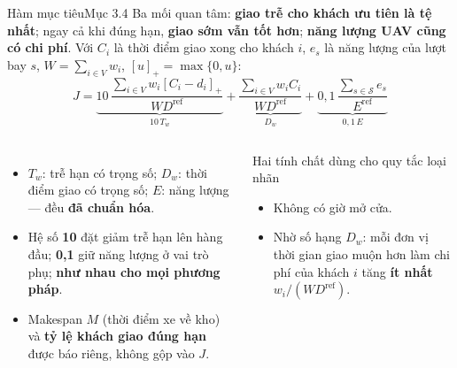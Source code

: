 \documentclass[aspectratio=169,10pt,t,xcolor={table}]{beamer}
\newcommand{\pos}[1]{\left[#1\right]_{+}}
\newcommand{\Dref}{D^{\mathrm{ref}}}
\newcommand{\Eref}{E^{\mathrm{ref}}}
\newcommand{\src}[1]{\hfill{\normalfont\footnotesize\color{white!62!navy}#1}}  %
\begin{document}
\begin{frame}{Hàm mục tiêu\src{Mục 3.4}}
\footnotesize
Ba mối quan tâm: \textbf{giao trễ cho khách ưu tiên là tệ nhất}; ngay cả khi đúng hạn, \textbf{giao sớm vẫn tốt hơn}; \textbf{năng lượng UAV cũng có chi phí}.
Với $C_i$ là thời điểm giao xong cho khách $i$, $e_s$ là năng lượng của lượt bay $s$, $W=\sum_{i\in V}w_i$, $\pos{u}=\max\{0,u\}$:
\begin{equation}\tag{2}
J=\underbrace{10\,\frac{\sum_{i\in V}w_i\pos{C_i-d_i}}{W\Dref}}_{10\,T_w}
 +\underbrace{\frac{\sum_{i\in V}w_iC_i}{W\Dref}}_{D_w}
 +\underbrace{0{,}1\,\frac{\sum_{s\in\mathcal S}e_s}{\Eref}}_{0{,}1\,E}
\end{equation}
\begin{columns}[T,onlytextwidth]
\begin{itemize}
\item $T_w$: trễ hạn có trọng số; $D_w$: thời điểm giao có trọng số; $E$: năng lượng --- đều \textbf{đã chuẩn hóa}.
\item Hệ số \textbf{10} đặt giảm trễ hạn lên hàng đầu; \textbf{0,1} giữ năng lượng ở vai trò phụ; \textbf{như nhau cho mọi phương pháp}.
\item Makespan $M$ (thời điểm xe về kho) và \textbf{tỷ lệ khách giao đúng hạn} được báo riêng, không gộp vào $J$.
\end{itemize}
\begin{block}{Hai tính chất dùng cho quy tắc loại nhãn}
\footnotesize
\begin{itemize}
\item Không có giờ mở cửa.
\item Nhờ số hạng $D_w$: mỗi đơn vị thời gian giao muộn hơn làm chi phí của khách $i$ tăng \textbf{ít nhất} $w_i/(W\Dref)$.
\end{itemize}
\end{block}
\end{columns}
\end{frame}
\end{document}
